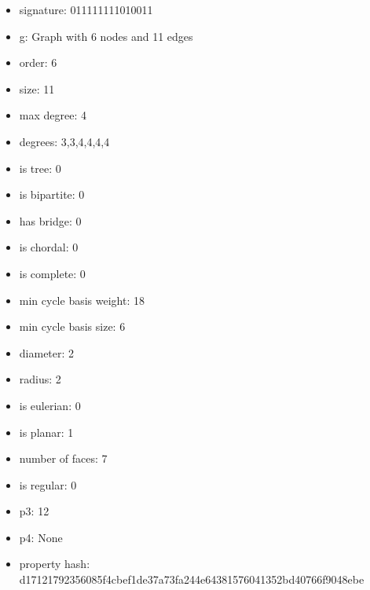 \begin{itemize}
\item signature: 011111111010011
\item g: Graph with 6 nodes and 11 edges
\item order: 6
\item size: 11
\item max degree: 4
\item degrees: 3,3,4,4,4,4
\item is tree: 0
\item is bipartite: 0
\item has bridge: 0
\item is chordal: 0
\item is complete: 0
\item min cycle basis weight: 18
\item min cycle basis size: 6
\item diameter: 2
\item radius: 2
\item is eulerian: 0
\item is planar: 1
\item number of faces: 7
\item is regular: 0
\item p3: 12
\item p4: None
\item property hash: d17121792356085f4cbef1de37a73fa244e64381576041352bd40766f9048ebe
\end{itemize}
\newpage
\begin{figure}
\end{figure}
